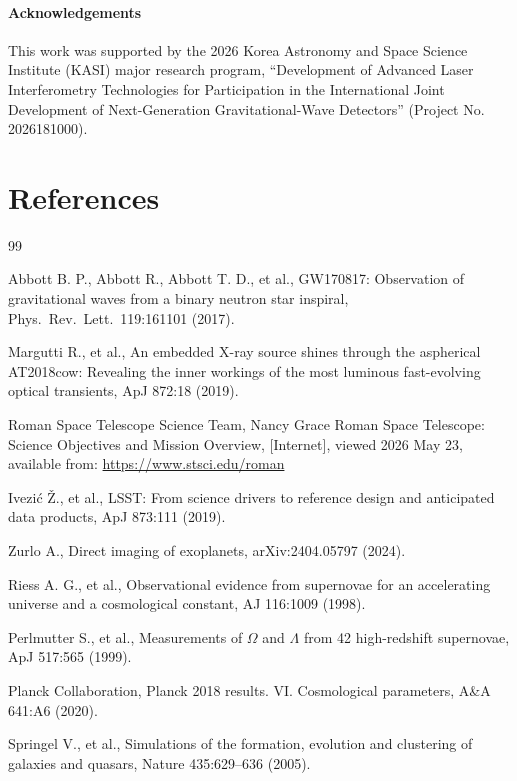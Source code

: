 \subsubsection{Acknowledgements}

This work was supported by the 2026 Korea Astronomy and Space Science Institute (KASI) major research program, ``Development of Advanced Laser Interferometry Technologies for Participation in the International Joint Development of Next-Generation Gravitational-Wave Detectors'' (Project No. 2026181000).

\chapter*{References}

\begin{thebibliography}{99}\small

Abbott B. P., Abbott R., Abbott T. D., et al., GW170817: Observation of gravitational waves from a binary neutron star inspiral, Phys.\ Rev.\ Lett.\ 119:161101 (2017).

Margutti R., et al., An embedded X-ray source shines through the aspherical AT2018cow: Revealing the inner workings of the most luminous fast-evolving optical transients, ApJ 872:18 (2019).

Roman Space Telescope Science Team, Nancy Grace Roman Space Telescope: Science Objectives and Mission Overview, [Internet], viewed 2026 May 23, available from: \url{https://www.stsci.edu/roman}

Ivezi\'{c} \v{Z}., et al., LSST: From science drivers to reference design and anticipated data products, ApJ 873:111 (2019).

Zurlo A., Direct imaging of exoplanets, arXiv:2404.05797 (2024).

Riess A. G., et al., Observational evidence from supernovae for an accelerating universe and a cosmological constant, AJ 116:1009 (1998).

Perlmutter S., et al., Measurements of $\Omega$ and $\Lambda$ from 42 high-redshift supernovae, ApJ 517:565 (1999).

Planck Collaboration, Planck 2018 results. VI. Cosmological parameters, A\&A 641:A6 (2020).

Springel V., et al., Simulations of the formation, evolution and clustering of galaxies and quasars, Nature 435:629--636 (2005).


\end{thebibliography}
